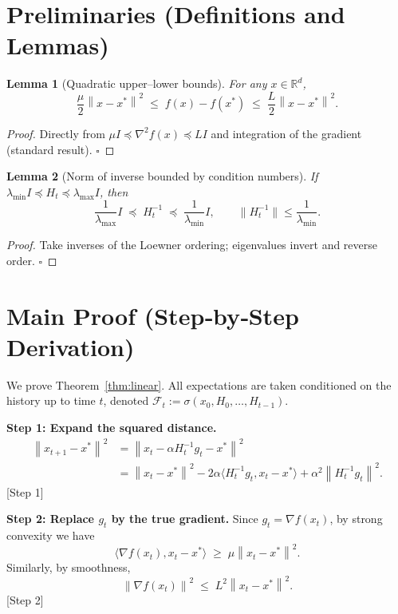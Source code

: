 \documentclass[11pt]{article}
\newtheorem{lemma}{Lemma}
\newcommand{\norm}[1]{\left\|#1\right\|}
\newcommand{\ip}[2]{\langle #1,#2\rangle}
\begin{document}
\newpage
\section*{Preliminaries (Definitions and Lemmas)}
\begin{lemma}[Quadratic upper–lower bounds]\label{lem:quad}
For any $x\in\mathbb{R}^{d}$,
\[
\frac{\mu}{2}\norm{x-x^{*}}^{2}\;\le\; f(x)-f(x^{*})\;\le\;\frac{L}{2}\norm{x-x^{*}}^{2}.
\]
\end{lemma}
\begin{proof}
Directly from $\mu I\preceq\nabla^{2}f(x)\preceq LI$ and integration of the gradient (standard result). \hfill $\square$
\end{proof}

\begin{lemma}[Norm of inverse bounded by condition numbers]\label{lem:inv}
If $\lambda_{\min}I\preceq H_{t}\preceq \lambda_{\max}I$, then
\[
\frac{1}{\lambda_{\max}} I\;\preceq\; H_{t}^{-1}\;\preceq\;\frac{1}{\lambda_{\min}} I,
\qquad
\|H_{t}^{-1}\|\le\frac{1}{\lambda_{\min}}.
\]
\end{lemma}
\begin{proof}
Take inverses of the Loewner ordering; eigenvalues invert and reverse order. \hfill $\square$
\end{proof}

\section*{Main Proof (Step‑by‑Step Derivation)}
We prove Theorem~\ref{thm:linear}. All expectations are taken conditioned on the history up to time $t$, denoted $\mathcal{F}_{t}:=\sigma(x_{0},H_{0},\dots,H_{t-1})$.

\bigskip
\noindent\textbf{Step 1: Expand the squared distance.}  
\begin{align}
\norm{x_{t+1}-x^{*}}^{2}
&=\norm{x_{t}-\alpha H_{t}^{-1}g_{t}-x^{*}}^{2} \nonumber\\
&=\norm{x_{t}-x^{*}}^{2}
-2\alpha\ip{H_{t}^{-1}g_{t}}{x_{t}-x^{*}}
+\alpha^{2}\norm{H_{t}^{-1}g_{t}}^{2}. \label{eq:expand}
\end{align}
[Step 1]

\bigskip
\noindent\textbf{Step 2: Replace $g_{t}$ by the true gradient.}  
Since $g_{t}= \nabla f(x_{t})$, by strong convexity we have
\[
\ip{\nabla f(x_{t})}{x_{t}-x^{*}}\;\ge\;\mu\norm{x_{t}-x^{*}}^{2}. \tag{2.1}
\]
Similarly, by smoothness,
\[
\norm{\nabla f(x_{t})}^{2}\;\le\;L^{2}\norm{x_{t}-x^{*}}^{2}. \tag{2.2}
\]
[Step 2]
\end{document}

